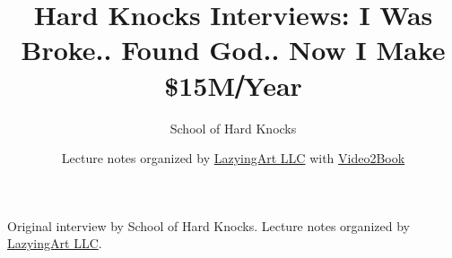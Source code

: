 \documentclass[11pt,oneside]{book}
\begin{document}
\frontmatter
\title{Hard Knocks Interviews: I Was Broke.. Found God.. Now I Make \$15M⧸Year}
\author{School of Hard Knocks}
\date{Lecture notes organized by \href{https://lazying.art}{LazyingArt LLC} with \href{https://github.com/lachlanchen/Video2Book}{Video2Book}}
\maketitle
\begin{center}
\small Original interview by School of Hard Knocks. Lecture notes organized by \href{https://lazying.art}{LazyingArt LLC}.
\end{center}
\clearpage
\mainmatter

\end{document}
